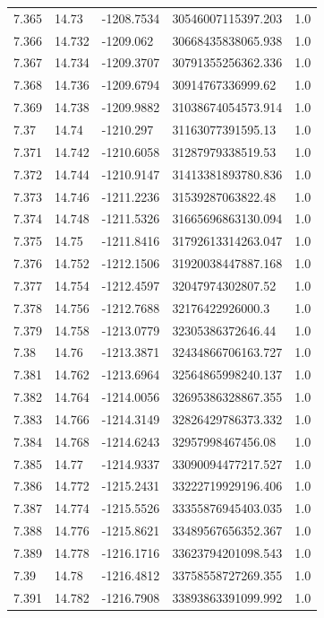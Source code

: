 \begin{tabular}{lllll}
7.365 & 14.73 & -1208.7534 & 30546007115397.203 & 1.0 \\
7.366 & 14.732 & -1209.062 & 30668435838065.938 & 1.0 \\
7.367 & 14.734 & -1209.3707 & 30791355256362.336 & 1.0 \\
7.368 & 14.736 & -1209.6794 & 30914767336999.62 & 1.0 \\
7.369 & 14.738 & -1209.9882 & 31038674054573.914 & 1.0 \\
7.37 & 14.74 & -1210.297 & 31163077391595.13 & 1.0 \\
7.371 & 14.742 & -1210.6058 & 31287979338519.53 & 1.0 \\
7.372 & 14.744 & -1210.9147 & 31413381893780.836 & 1.0 \\
7.373 & 14.746 & -1211.2236 & 31539287063822.48 & 1.0 \\
7.374 & 14.748 & -1211.5326 & 31665696863130.094 & 1.0 \\
7.375 & 14.75 & -1211.8416 & 31792613314263.047 & 1.0 \\
7.376 & 14.752 & -1212.1506 & 31920038447887.168 & 1.0 \\
7.377 & 14.754 & -1212.4597 & 32047974302807.52 & 1.0 \\
7.378 & 14.756 & -1212.7688 & 32176422926000.3 & 1.0 \\
7.379 & 14.758 & -1213.0779 & 32305386372646.44 & 1.0 \\
7.38 & 14.76 & -1213.3871 & 32434866706163.727 & 1.0 \\
7.381 & 14.762 & -1213.6964 & 32564865998240.137 & 1.0 \\
7.382 & 14.764 & -1214.0056 & 32695386328867.355 & 1.0 \\
7.383 & 14.766 & -1214.3149 & 32826429786373.332 & 1.0 \\
7.384 & 14.768 & -1214.6243 & 32957998467456.08 & 1.0 \\
7.385 & 14.77 & -1214.9337 & 33090094477217.527 & 1.0 \\
7.386 & 14.772 & -1215.2431 & 33222719929196.406 & 1.0 \\
7.387 & 14.774 & -1215.5526 & 33355876945403.035 & 1.0 \\
7.388 & 14.776 & -1215.8621 & 33489567656352.367 & 1.0 \\
7.389 & 14.778 & -1216.1716 & 33623794201098.543 & 1.0 \\
7.39 & 14.78 & -1216.4812 & 33758558727269.355 & 1.0 \\
7.391 & 14.782 & -1216.7908 & 33893863391099.992 & 1.0 \\

\end{tabular}
